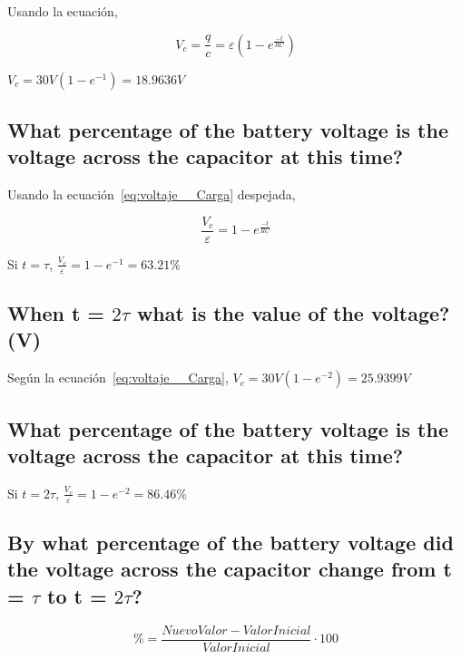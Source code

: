 \documentclass[twocolumn, 12pt]{article}
\begin{document}
Usando la ecuación,

{\large
        \begin{equation}
            V_c = \frac{q}{c} = \varepsilon (1 - e^{\frac{-t}{RC}})
            \label{eq:voltaje__Carga}
        \end{equation}
    }

$V_c = 30V (1 - e^{-1}) = 18.9636V$

\subsection{What percentage of the battery voltage is the voltage across the capacitor at this time?}

Usando la ecuación~\eqref{eq:voltaje__Carga} despejada,

{\large
        \begin{equation}
            \frac{V_c}{\varepsilon} = 1 - e^{\frac{-t}{RC}}
            \label{eq:voltaje__Carga-Porcentaje}
        \end{equation}
    }

Si $t = \tau$, $\frac{V_c}{\varepsilon} = 1 - e^{-1} =
    63.21\%$

\subsection{When t = $2\tau$ what is the value of the voltage? (V)}

Según la ecuación~\eqref{eq:voltaje__Carga}, $V_c = 30V (1
    - e^{-2}) = 25.9399V$

\subsection{What percentage of the battery voltage is the voltage across the capacitor at this time?}

Si $t = 2\tau$, $\frac{V_c}{\varepsilon} = 1 - e^{-2} =
    86.46\%$

\subsection{By what percentage of the battery voltage did the voltage across the capacitor change from
    t = $\tau$ to t = $2\tau$?}

{\large
    \begin{equation}
        \% = \frac{NuevoValor - ValorInicial}{ValorInicial} \cdot 100
        \label{eq:porcentajeCambio}
    \end{equation}
}
\end{document}
